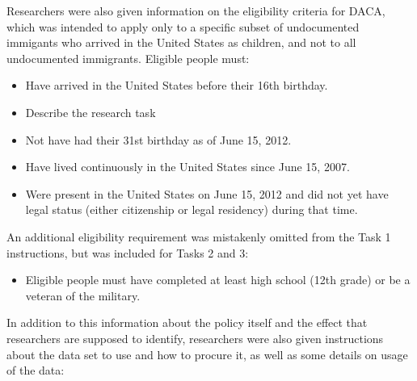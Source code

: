 \documentclass[
  letterpaper,
  DIV=11,
  numbers=noendperiod]{scrartcl}
\providecommand{\tightlist}{%
  \setlength{\itemsep}{0pt}\setlength{\parskip}{0pt}}\usepackage{longtable,booktabs,array}
\begin{document}
Researchers were also given information on the eligibility criteria for
DACA, which was intended to apply only to a specific subset of
undocumented immigants who arrived in the United States as children, and
not to all undocumented immigrants. Eligible people must:

\begin{itemize}
\item
  Have arrived in the United States before their 16th birthday.
\item
  Describe the research task
\item
  Not have had their 31st birthday as of June 15, 2012.
\item
  Have lived continuously in the United States since June 15, 2007.
\item
  Were present in the United States on June 15, 2012 and did not yet
  have legal status (either citizenship or legal residency) during that
  time.
\end{itemize}

An additional eligibility requirement was mistakenly omitted from the
Task 1 instructions, but was included for Tasks 2 and 3:

\begin{itemize}
\tightlist
\item
  Eligible people must have completed at least high school (12th grade)
  or be a veteran of the military.
\end{itemize}

In addition to this information about the policy itself and the effect
that researchers are supposed to identify, researchers were also given
instructions about the data set to use and how to procure it, as well as
some details on usage of the data:
\end{document}
